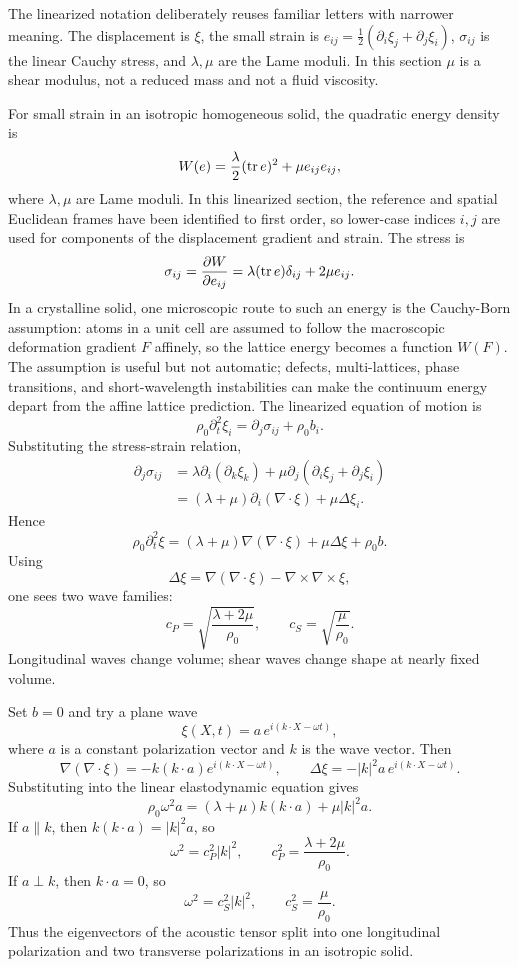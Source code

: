 The linearized notation deliberately reuses familiar letters with narrower
meaning.  The displacement is \(\xi\), the small strain is
\(e_{ij}=\frac12(\partial_i\xi_j+\partial_j\xi_i)\), \(\sigma_{ij}\) is the
linear Cauchy stress, and \(\lambda,\mu\) are the Lame moduli.  In this section
\(\mu\) is a shear modulus, not a reduced mass and not a fluid viscosity.

For small strain in an isotropic homogeneous solid, the quadratic energy density
is
\[
  W(e)=\frac{\lambda}{2}(\operatorname{tr} e)^2+\mu e_{ij}e_{ij},
\]
where \(\lambda,\mu\) are Lame moduli. In this linearized section, the
reference and spatial Euclidean frames have been identified to first order, so
lower-case indices \(i,j\) are used for components of the displacement gradient
and strain. The stress is
\[
  \sigma_{ij}
  =
  \frac{\partial W}{\partial e_{ij}}
  =
  \lambda(\operatorname{tr} e)\delta_{ij}+2\mu e_{ij}.
\]
In a crystalline solid, one microscopic route to such an energy is the
Cauchy-Born assumption: atoms in a unit cell are assumed to follow the
macroscopic deformation gradient \(F\) affinely, so the lattice energy becomes a
function \(W(F)\). The assumption is useful but not automatic; defects,
multi-lattices, phase transitions, and short-wavelength instabilities can make
the continuum energy depart from the affine lattice prediction.
The linearized equation of motion is
\[
  \rho_0\partial_t^2\xi_i=\partial_j\sigma_{ij}+\rho_0 b_i.
\]
Substituting the stress-strain relation,
\[
\begin{aligned}
  \partial_j\sigma_{ij}
  &=
  \lambda\partial_i(\partial_k\xi_k)
  +
  \mu\partial_j(\partial_i\xi_j+\partial_j\xi_i)\\
  &=
  (\lambda+\mu)\partial_i(\nabla\cdot\xi)
  +
  \mu\Delta\xi_i.
\end{aligned}
\]
Hence
\[
  \boxed{
  \rho_0\partial_t^2\xi
  =
  (\lambda+\mu)\nabla(\nabla\cdot\xi)
  +
  \mu\Delta\xi
  +
  \rho_0 b.
  }
\]
Using
\[
  \Delta\xi=\nabla(\nabla\cdot\xi)-\nabla\times\nabla\times\xi,
\]
one sees two wave families:
\[
  c_P=\sqrt{\frac{\lambda+2\mu}{\rho_0}},
  \qquad
  c_S=\sqrt{\frac{\mu}{\rho_0}}.
\]
Longitudinal waves change volume; shear waves change shape at nearly fixed
volume.

\begin{derivation}
Set \(b=0\) and try a plane wave
\[
  \xi(X,t)=a\,e^{i(k\cdot X-\omega t)},
\]
where \(a\) is a constant polarization vector and \(k\) is the wave vector.
Then
\[
  \nabla(\nabla\cdot\xi)=-k(k\cdot a)e^{i(k\cdot X-\omega t)},
  \qquad
  \Delta\xi=-|k|^2a\,e^{i(k\cdot X-\omega t)}.
\]
Substituting into the linear elastodynamic equation gives
\[
  \rho_0\omega^2 a
  =
  (\lambda+\mu)k(k\cdot a)+\mu |k|^2a.
\]
If \(a\parallel k\), then \(k(k\cdot a)=|k|^2a\), so
\[
  \omega^2=c_P^2|k|^2,
  \qquad
  c_P^2=\frac{\lambda+2\mu}{\rho_0}.
\]
If \(a\perp k\), then \(k\cdot a=0\), so
\[
  \omega^2=c_S^2|k|^2,
  \qquad
  c_S^2=\frac{\mu}{\rho_0}.
\]
Thus the eigenvectors of the acoustic tensor split into one longitudinal
polarization and two transverse polarizations in an isotropic solid.
\end{derivation}

